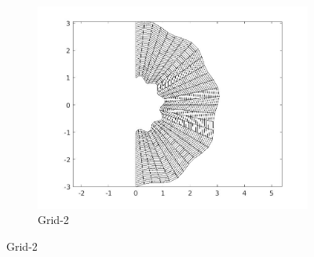 \documentclass{article}
\begin{document}
\begin{figure}
    \begin{subfigure}{\textwidth}
    \centering
    \includegraphics[scale=0.33]{grid_2.jpeg}
    \caption{Grid-2}
    \label{fig:doc1}
    \end{subfigure}


\end{figure}
\end{document}
